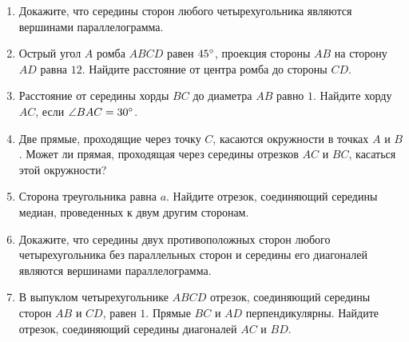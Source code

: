 \documentclass[12pt, a4paper]{article}
\begin{document}
	
	\begin{enumerate}
		\item Докажите, что середины сторон любого четырехугольника являются вершинами параллелограмма.
		\item Острый угол $A$ ромба $ABCD$ равен $45\degree$, проекция стороны $AB$ на сторону $AD$ равна $12$. Найдите расстояние от центра ромба до стороны $CD$.
		\item Расстояние от середины хорды $BC$ до диаметра $AB$ равно $1$. Найдите хорду $AC$, если $\angle BAC = 30 \degree$.

		\item Две прямые, проходящие через точку $C$, касаются окружности в точках $A$ и $B$. Может ли прямая, проходящая через середины отрезков $AC$ и $BC$, касаться этой окружности?
		\item Сторона треугольника равна $a$. Найдите отрезок, соединяющий середины медиан, проведенных к двум другим сторонам.
		\item Докажите, что середины двух противоположных сторон любого четырехугольника без параллельных сторон и середины его диагоналей являются вершинами параллелограмма.
		\item В выпуклом четырехугольнике $ABCD$ отрезок, соединяющий середины сторон $AB$ и $CD$, равен $1$. Прямые $BC$ и $AD$ перпендикулярны. Найдите отрезок, соединяющий середины диагоналей $AC$ и $BD$.
	\end{enumerate}
\end{document}

